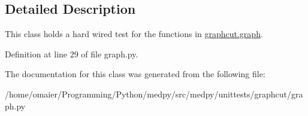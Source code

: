 \subsection{Detailed Description}
This class holds a hard wired test for the functions in \hyperlink{namespacemedpy_1_1graphcut_1_1graph}{graphcut.graph}. 

Definition at line 29 of file graph.py.



The documentation for this class was generated from the following file:\begin{DoxyCompactItemize}
\item 
/home/omaier/Programming/Python/medpy/src/medpy/unittests/graphcut/graph.py\end{DoxyCompactItemize}
